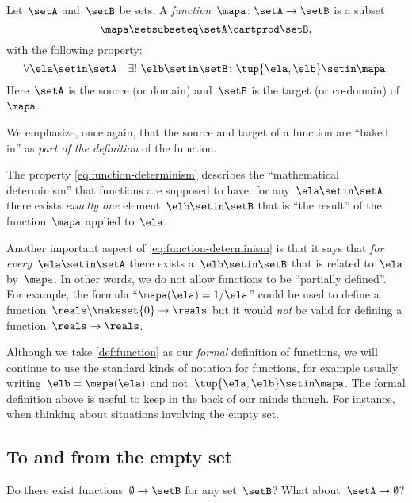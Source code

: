 \begin{ctdefinition}[Function]
    \label{def:function}
    Let~$\setA$ and~$\setB$ be sets.
    A \emph{function}~$\mapa\colon \setA \to \setB$ is a subset
    \begin{equation*}
        \mapa \setsubseteq \setA \cartprod \setB,
    \end{equation*}
    with the following property:
    \begin{equation}
        \label{eq:function-determinism}
        \forall \ela \setin\setA  \quad  \exists !
        \ \elb \setin\setB \colon \tup{\ela,\elb} \setin\mapa.
    \end{equation}
    Here~$\setA$ is the source (or domain) and~$\setB$ is the target (or co-domain) of~$\mapa$.
\end{ctdefinition}

We emphasize, once again, that the source and target of a function are ``baked in'' as \emph{part of the definition} of the function.

The property \cref{eq:function-determinism} describes the ``mathematical determinism'' that functions are supposed to have: for any~$\ela \setin\setA$ there exists \emph{exactly one} element~$\elb \setin\setB$ that is ``the result'' of the function~$\mapa$ applied to~$\ela$.

Another important aspect of \cref{eq:function-determinism} is that it says that \emph{for every}~$\ela \setin\setA$ there exists a~$\elb \setin\setB$ that is related to~$\ela$ by~$\mapa$.
In other words, we do not allow functions to be ``partially defined''.
For example, the formula ``$\mapa(\ela) = 1/ \ela$'' could be used to define a function~$\reals \backslash \makeset{ 0 } \to \reals$ but it would \emph{not} be valid for defining a function~$\reals \to \reals$.

Although we take \cref{def:function} as our \emph{formal} definition of functions, we will continue to use the standard kinds of notation for functions, for example usually writing~$\elb = \mapa(\ela)$ and not~$\tup{\ela, \elb} \setin\mapa$.
The formal definition above is useful to keep in the back of our minds though.
For instance, when thinking about situations involving the empty set.

\subsection{To and from the empty set}


Do there exist functions~$\emptyset \to \setB$ for any set~$\setB$?
What about~$\setA \to \emptyset$?


